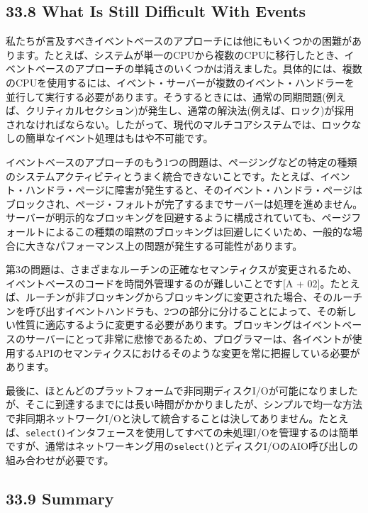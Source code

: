 \hypertarget{what-is-still-difficult-with-events}{%
\subsection*{33.8 What Is Still Difficult With
Events}\label{what-is-still-difficult-with-events}}

私たちが言及すべきイベントベースのアプローチには他にもいくつかの困難があります。たとえば、システムが単一のCPUから複数のCPUに移行したとき、イベントベースのアプローチの単純さのいくつかは消えました。具体的には、複数のCPUを使用するには、イベント・サーバーが複数のイベント・ハンドラーを並行して実行する必要があります。そうするときには、通常の同期問題(例えば、クリティカルセクション)が発生し、通常の解決法(例えば、ロック)が採用されなければならない。したがって、現代のマルチコアシステムでは、ロックなしの簡単なイベント処理はもはや不可能です。

イベントベースのアプローチのもう1つの問題は、ページングなどの特定の種類のシステムアクティビティとうまく統合できないことです。たとえば、イベント・ハンドラ・ページに障害が発生すると、そのイベント・ハンドラ・ページはブロックされ、ページ・フォルトが完了するまでサーバーは処理を進めません。サーバーが明示的なブロッキングを回避するように構成されていても、ページフォールトによるこの種類の暗黙のブロッキングは回避しにくいため、一般的な場合に大きなパフォーマンス上の問題が発生する可能性があります。

第3の問題は、さまざまなルーチンの正確なセマンティクスが変更されるため、イベントベースのコードを時間外管理するのが難しいことです{[}A
+
02{]}。たとえば、ルーチンが非ブロッキングからブロッキングに変更された場合、そのルーチンを呼び出すイベントハンドラも、2つの部分に分けることによって、その新しい性質に適応するように変更する必要があります。ブロッキングはイベントベースのサーバーにとって非常に悲惨であるため、プログラマーは、各イベントが使用するAPIのセマンティクスにおけるそのような変更を常に把握している必要があります。

最後に、ほとんどのプラットフォームで非同期ディスクI/Oが可能になりましたが、そこに到達するまでには長い時間がかかりましたが、シンプルで均一な方法で非同期ネットワークI/Oと決して統合することは決してありません。たとえば、\texttt{select()}インタフェースを使用してすべての未処理I/Oを管理するのは簡単ですが、通常はネットワーキング用の\texttt{select()}とディスクI/OのAIO呼び出しの組み合わせが必要です。

\hypertarget{summary-22}{%
\subsection*{33.9 Summary}\label{summary-22}}

